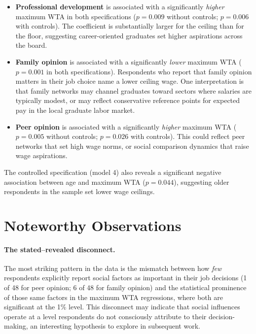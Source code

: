 \documentclass[12pt]{article}
\begin{document}
\begin{itemize}
    \item \textbf{Professional development} is associated with a significantly
    \emph{higher} maximum WTA in both specifications ($p = 0.009$ without
    controls; $p = 0.006$ with controls). The coefficient is substantially
    larger for the ceiling than for the floor, suggesting career-oriented
    graduates set higher aspirations across the board.

    \item \textbf{Family opinion} is associated with a significantly \emph{lower}
    maximum WTA ($p = 0.001$ in both specifications). Respondents who report
    that family opinion matters in their job choice name a lower ceiling wage.
    One interpretation is that family networks may channel graduates toward
    sectors where salaries are typically modest, or may reflect conservative
    reference points for expected pay in the local graduate labor market.

    \item \textbf{Peer opinion} is associated with a significantly \emph{higher}
    maximum WTA ($p = 0.005$ without controls; $p = 0.026$ with controls).
    This could reflect peer networks that set high wage norms, or social
    comparison dynamics that raise wage aspirations.
\end{itemize}

The controlled specification (model 4) also reveals a significant negative
association between age and maximum WTA ($p = 0.044$), suggesting older
respondents in the sample set lower wage ceilings.

\section{Noteworthy Observations}

\paragraph{The stated--revealed disconnect.}
The most striking pattern in the data is the mismatch between how \emph{few}
respondents explicitly report social factors as important in their job decisions
(1 of 48 for peer opinion; 6 of 48 for family opinion) and the statistical
prominence of those same factors in the maximum WTA regressions, where both are
significant at the 1\% level. This disconnect may indicate that social influences
operate at a level respondents do not consciously attribute to their
decision-making, an interesting hypothesis to explore in subsequent work.
\end{document}
